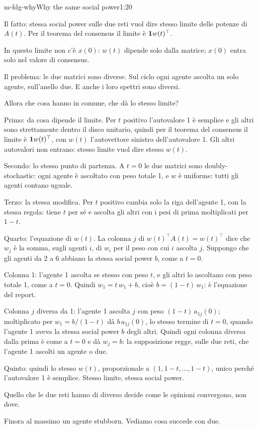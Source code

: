 \begin{slidetre}{m-fdg-why}{Why the same social power}{1:20}
  \begin{discorso}
    \item Il fatto: stessa social power sulle due reti vuol dire stesso limite delle potenze di $A(t)$. Per il teorema del consensus il limite è $\mathbf{1} w(t)^\top$.
    \item In questo limite non c'è $x(0)$: $w(t)$ dipende solo dalla matrice; $x(0)$ entra solo nel valore di consensus.
    \item Il problema: le due matrici sono diverse. Sul ciclo ogni agente ascolta un solo agente, sull'anello due. E anche i loro spettri sono diversi.
    \item Allora che cosa hanno in comune, che dà lo stesso limite?
    \item \clic Primo: da cosa dipende il limite. Per $t$ positivo l'autovalore 1 è semplice e gli altri sono strettamente dentro il disco unitario, quindi per il teorema del consensus il limite è $\mathbf{1} w(t)^\top$, con $w(t)$ l'autovettore sinistro dell'autovalore 1. Gli altri autovalori non entrano: stesso limite vuol dire stesso $w(t)$.
    \item Secondo: lo stesso punto di partenza. A $t=0$ le due matrici sono doubly-stochastic: ogni agente è ascoltato con peso totale 1, e $w$ è uniforme: tutti gli agenti contano uguale.
    \item Terzo: la stessa modifica. Per $t$ positivo cambia solo la riga dell'agente 1, con la stessa regola: tiene $t$ per sé e ascolta gli altri con i pesi di prima moltiplicati per $1-t$.
    \item \clic Quarto: l'equazione di $w(t)$. La colonna $j$ di $w(t)^\top A(t)=w(t)^\top$ dice che $w_j$ è la somma, sugli agenti $i$, di $w_i$ per il peso con cui $i$ ascolta $j$. Suppongo che gli agenti da 2 a 6 abbiano la stessa social power $b$, come a $t=0$.
    \item Colonna 1: l'agente 1 ascolta se stesso con peso $t$, e gli altri lo ascoltano con peso totale 1, come a $t=0$. Quindi $w_1=t\,w_1+b$, cioè $b=(1-t)\,w_1$: è l'equazione del report.
    \item Colonna $j$ diversa da 1: l'agente 1 ascolta $j$ con peso $(1-t)\,a_{1j}(0)$; moltiplicato per $w_1=b/(1-t)$ dà $b\,a_{1j}(0)$, lo stesso termine di $t=0$, quando l'agente 1 aveva la stessa social power $b$ degli altri. Quindi ogni colonna diversa dalla prima è come a $t=0$ e dà $w_j=b$: la supposizione regge, sulle due reti, che l'agente 1 ascolti un agente o due.
    \item Quinto: quindi lo stesso $w(t)$, proporzionale a $(1,1-t,\dots,1-t)$, unico perché l'autovalore 1 è semplice. Stesso limite, stessa social power.
    \item Quello che le due reti hanno di diverso decide come le opinioni convergono, non dove.
    \item Finora al massimo un agente stubborn. Vediamo cosa succede con due.
  \end{discorso}
\end{slidetre}

